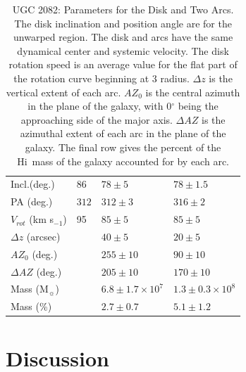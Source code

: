 \documentclass[useAMS,usenatbib]{mn2e}
\newcommand{\msun}{M$_{\sun}$}
\newcommand\HI{H{\sc i}}
\begin{document}
{\begin{table}
\begin{tabular}{@{} llll @{}}
Incl.(deg.) & $86$ & $78 \pm 5$ & $78 \pm 1.5$ \\
PA (deg.) & $312$ & $312 \pm 3$ & $316 \pm 2$\\
$V_{rot}$ (km s$_{-1}$) & 95 & $85\pm 5$ & $85 \pm 5$ \\
$\Delta z$ (arcsec) & & $40\pm 5$ & $20 \pm 5$\\
$AZ_0$ (deg.) & & $255\pm 10$ & $90 \pm 10$\\
$\Delta AZ$ (deg.) & & $205\pm 10$ & $170 \pm 10$\\
Mass (\msun) & & $6.8 \pm 1.7 \times 10^7$ & $1.3 \pm 0.3 \times 10^8$ \\
Mass (\%) & & $2.7 \pm 0.7$ & $5.1 \pm 1.2$ \\
\hline
    \end{tabular}
    \caption{UGC 2082: Parameters for the Disk and Two Arcs. The disk inclination and position angle are for the unwarped region.  The disk and arcs have the same dynamical center and systemic velocity.  The disk rotation speed is an average value for the flat part of the rotation curve beginning at 3 \arcmin radius. $\Delta z$ is the vertical extent of each arc.  $AZ_0$ is
the central azimuth in the plane of the galaxy, with 0$^{\circ}$ being the
approaching side of the major axis.  $\Delta AZ$ is the azimuthal extent of
each arc in the plane of the galaxy.  The final row gives the percent of the \HI\ mass of the galaxy accounted for by each arc.}
    \label{tab1}
 \end{table}
 \section{Discussion}\label{disc}
}
\end{document}

